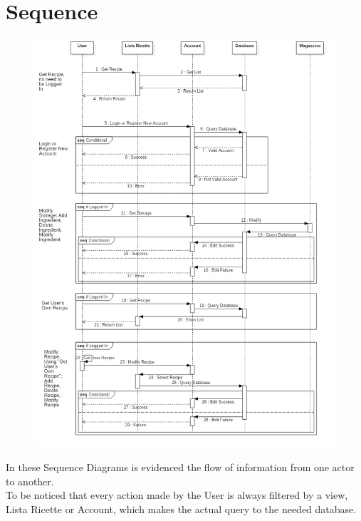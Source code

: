 \documentclass[12pt]{article}
\begin{document}
\section{Sequence}
\begin{figure}[H]
\includegraphics[scale=0.5]{SequenceDiagram1.png}
\centering
\end{figure}
\thispagestyle{empty}
\pagebreak
In these Sequence Diagrams is evidenced the flow of information from one actor to another.\\
To be noticed that every action made by the User is always filtered by a view, Lista Ricette or Account, which makes the actual query to the needed database.\\
\end{document}
